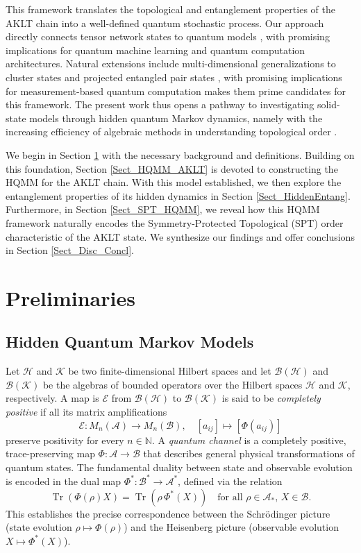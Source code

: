 \documentclass[12pt,a4paper]{article}
\begin{document}
This framework translates the topological and entanglement properties of the AKLT chain into a  well-defined quantum stochastic process. Our approach directly connects tensor network states \cite{SV12} to   quantum models \cite{BCLY20}, with promising implications for   quantum machine learning  and quantum computation architectures. Natural extensions include multi-dimensional generalizations to cluster states and projected entangled pair states \cite{Schuch2011, Chen2009}, with promising implications for measurement-based quantum computation \cite{Chen24, Von08} makes them prime candidates for this framework. The present work thus opens a pathway to investigating solid-state models through hidden quantum Markov dynamics, namely with the increasing efficiency of algebraic methods in understanding topological  order \cite{kap25, O22} .

We begin in Section \ref{Sect_prel} with the necessary background and definitions. Building on this foundation, Section \ref{Sect_HQMM_AKLT} is devoted to constructing the  HQMM for the AKLT chain. With this model established, we then explore the entanglement properties of its hidden dynamics in Section \ref{Sect_HiddenEntang}. Furthermore, in Section \ref{Sect_SPT_HQMM}, we reveal how this HQMM framework naturally encodes the Symmetry-Protected Topological (SPT) order characteristic of the AKLT state. We synthesize our findings and offer conclusions in Section \ref{Sect_Disc_Concl}.

\section{Preliminaries}\label{Sect_prel}
\subsection{ Hidden Quantum Markov Models}

Let $\mathcal{H}$ and $\mathcal{K}$ be two  finite-dimensional Hilbert spaces and let $\mathcal{B}(\mathcal{H})$ and $\mathcal{B}(\mathcal{K})$ be the algebras of bounded operators over the Hilbert spaces $\mathcal{H}$ and $\mathcal{K}$, respectively.  A map is $\mathcal{E}$ from  $\mathcal{B}(\mathcal{H})$ to  $\mathcal{B}(\mathcal{K})$ is said to be \emph{completely positive} if all its matrix amplifications
\[
\mathcal{E}: M_n(\mathcal{A}) \to M_n(\mathcal{B}), \quad [a_{ij}] \mapsto [\Phi(a_{ij})]
\]
preserve positivity for every $n \in \mathbb{N}$.   A \emph{quantum channel} is a completely positive, trace-preserving map $\Phi: \mathcal{A} \to \mathcal{B}$ that describes general physical transformations of quantum states. The fundamental duality between state and observable evolution is encoded in the dual map $\Phi^*: \mathcal{B}^* \to \mathcal{A}^*$, defined via the relation
\[
\operatorname{Tr}(\Phi(\rho) X) = \operatorname{Tr}(\rho \, \Phi^*(X)) \quad \text{for all } \rho \in \mathcal{A}_*, \, X \in \mathcal{B}.
\]
This establishes the precise correspondence between the Schrödinger picture (state evolution $\rho \mapsto \Phi(\rho)$) and the Heisenberg picture (observable evolution $X \mapsto \Phi^*(X)$).
\end{document}
